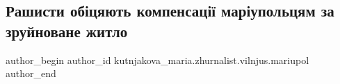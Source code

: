  
 
 
 
 

\subsection{Рашисти обіцяють компенсації маріупольцям за зруйноване житло}
\label{sec:16_05_2022.fb.kutnjakova_maria.zhurnalist.vilnjus.mariupol.1.rashisti_ob_tsyayut_}

\ifcmt
 author_begin
   author_id kutnjakova_maria.zhurnalist.vilnjus.mariupol
 author_end
\fi
